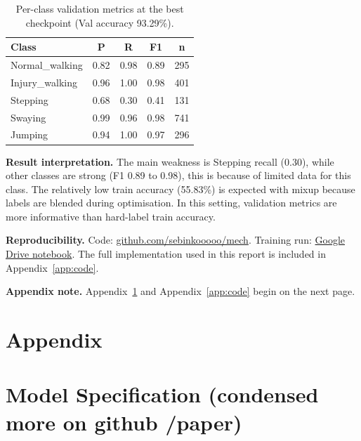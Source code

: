 \documentclass[10pt,a4paper,twocolumn]{article}
\begin{document}
\begin{table}[H]
\centering
\scriptsize
\begin{tabular}{lcccc}
\toprule
\textbf{Class} & \textbf{P} & \textbf{R} & \textbf{F1} & \textbf{n} \\
\midrule
Normal\_walking & 0.82 & 0.98 & 0.89 & 295 \\
Injury\_walking & 0.96 & 1.00 & 0.98 & 401 \\
Stepping & 0.68 & 0.30 & 0.41 & 131 \\
Swaying & 0.99 & 0.96 & 0.98 & 741 \\
Jumping & 0.94 & 1.00 & 0.97 & 296 \\
\bottomrule
\end{tabular}
\caption{Per-class validation metrics at the best checkpoint (Val accuracy 93.29\%).}
\label{tab:per_class_results}
\end{table}

\noindent\textbf{Result interpretation.} The main weakness is Stepping recall (0.30), while other classes are strong (F1 0.89 to 0.98), this is because of limited data for this class. The relatively low train accuracy (55.83\%) is expected with mixup because labels are blended during optimisation. In this setting, validation metrics are more informative than hard-label train accuracy.

\noindent\textbf{Reproducibility.} Code: \href{https://github.com/sebinkooooo/mech.git}{github.com/sebinkooooo/mech}. Training run: \href{https://drive.google.com/file/d/1iLZLUPbs637IBlTrdomt-Pahzhj9ZaGV/view?usp=sharing}{Google Drive notebook}. The full implementation used in this report is included in Appendix~\ref{app:code}.

\noindent\textbf{Appendix note.} Appendix~\ref{app:modelspec} and Appendix~\ref{app:code} begin on the next page.

\appendix
\onecolumn
\section*{Appendix}
\section{Model Specification (condensed more on github /paper)}
\label{app:modelspec}
\end{document}
